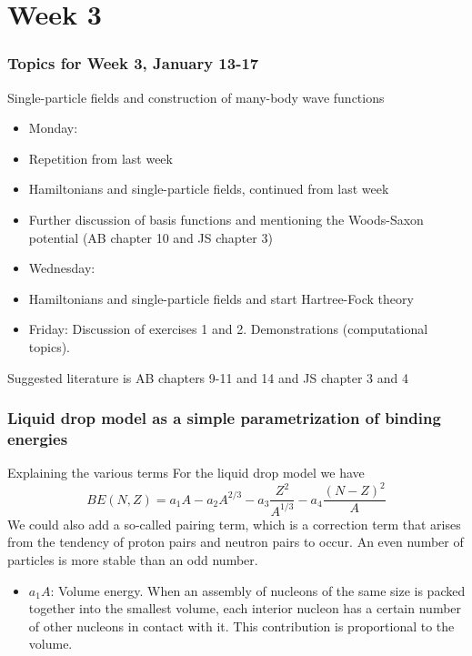 \documentclass[compress]{beamer}
\begin{document}
\section[Week 3]{Week 3}

\frame
{
  \frametitle{Topics for Week 3, January 13-17}
  \begin{block}{Single-particle fields and construction of many-body wave functions}
\begin{itemize}
\item Monday:
\item Repetition from last week
\item Hamiltonians and single-particle fields, continued from last week
\item Further discussion of basis functions and mentioning the Woods-Saxon potential (AB chapter 10 and JS chapter 3)
\item Wednesday:
\item Hamiltonians and single-particle fields and start Hartree-Fock theory
\item Friday: Discussion of exercises 1 and 2. Demonstrations (computational topics).
\end{itemize}
Suggested literature is AB chapters 9-11 and 14 and JS chapter 3 and 4
  \end{block}
} 



\frame
{
  \frametitle{Liquid drop model as a simple parametrization of binding energies}
  \begin{block}{Explaining the various terms}
For the liquid drop model we have
\[ BE(N,Z) = a_1A-a_2A^{2/3}-a_3\frac{Z^2}{A^{1/3}}-a_4\frac{(N-Z)^2}{A}\]
We could also add a so-called pairing term, which is a correction term that
arises from the tendency of proton pairs and neutron pairs to
occur. An even number of particles is more stable than an odd number.
\begin{itemize}
\item $a_1A$: Volume energy. When an assembly of nucleons of the same size is packed
together into the smallest volume, each interior nucleon has a certain
number of other nucleons in contact with it. This contribution is proportional to the volume.
\end{itemize}

  \end{block}
} 
\end{document}
